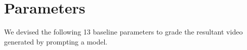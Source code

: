 \documentclass[sigconf]{acmart}
\begin{document}









\section{Parameters}
\label{app:parameters}


We devised the following 13 baseline parameters to grade the resultant video generated by prompting a model.
\end{document}
